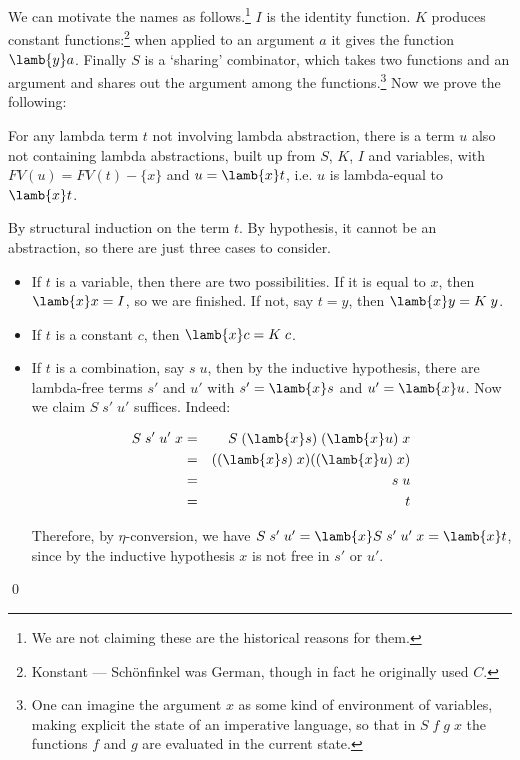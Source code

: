 We can motivate the names as follows.\footnote{We are not claiming these are
the historical reasons for them.} $I$ is the identity function. $K$ produces
constant functions:\footnote{Konstant --- Sch\"onfinkel was German, though in
fact he originally used $C$.} when applied to an argument $a$ it gives the
function $\lamb{y} a$. Finally $S$ is a `sharing' combinator, which takes two
functions and an argument and shares out the argument among the 
functions.\footnote{One can imagine the argument $x$ as some kind of 
environment of variables, making explicit the state of an imperative language, 
so that in $S\;f\;g\;x$ the functions $f$ and $g$ are evaluated in the current 
state.} Now we prove the following:

\begin{lemma}
For any lambda term $t$ not involving lambda abstraction, there is a term $u$
also not containing lambda abstractions, built up from $S$, $K$, $I$ and
variables, with $FV(u) = FV(t) - \{x\}$ and $u = \lamb{x} t$, i.e. $u$ is
lambda-equal to $\lamb{x} t$.

\proof By structural induction on the term $t$. By hypothesis, it cannot
be an abstraction, so there are just three cases to consider.

\begin{itemize}

\item If $t$ is a variable, then there are two possibilities. If it is equal to
$x$, then $\lamb{x} x = I$, so we are finished. If not, say $t = y$, then
$\lamb{x} y = K\; y$.

\item If $t$ is a constant $c$, then $\lamb{x} c = K\; c$.

\item If $t$ is a combination, say $s\; u$, then by the inductive hypothesis,
there are lambda-free terms $s'$ and $u'$ with $s' = \lamb{x} s$ and $u' =
\lamb{x} u$. Now we claim $S\;s'\;u'$ suffices. Indeed:

\begin{eqnarray*}
S\;s'\;u'\;x & = & S\;(\lamb{x} s)\; (\lamb{x} u)\; x     \\
             & = & ((\lamb{x} s)\; x) ((\lamb{x} u)\; x)  \\
             & = & s\; u                                  \\
             & = & t
\end{eqnarray*}

Therefore, by $\eta$-conversion, we have $S\;s'\;u' = \lamb{x} S\;s'\;u'\; x =
\lamb{x} t$, since by the inductive hypothesis $x$ is not free in $s'$ or $u'$.

\end{itemize}

\qed

\end{lemma}

